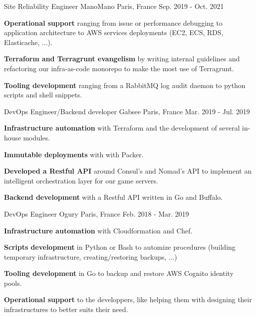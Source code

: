 \begin{cventries}
  \cventry
    {Site Reliability Engineer} %
    {ManoMano} %
    {Paris, France} %
    {Sep. 2019 - Oct. 2021} %
    {
      \begin{cvitems} %
        \item {\textbf{Operational support} ranging from issue or performance debugging to application architecture to AWS services deployments (EC2, ECS, RDS, Elasticache, ...).}
        \item {\textbf{Terraform and Terragrunt evangelism} by writing internal guidelines and refactoring our infra-as-code monorepo to make the most use of Terragrunt.}
        \item {\textbf{Tooling development} ranging from a RabbitMQ log audit daemon to python scripts and shell snippets.}
      \end{cvitems}
    }

  \cventry
    {DevOps Engineer/Backend developer} %
    {Gabsee} %
    {Paris, France} %
    {Mar. 2019 - Jul. 2019} %
    {
      \begin{cvitems} %
        \item {\textbf{Infrastructure automation} with Terraform and the development of several in-house modules.}
        \item {\textbf{Immutable deployments} with with Packer.}
        \item {\textbf{Developed a Restful API} around Consul's and Nomad's API to implement an intelligent orchestration layer for our game servers.}
        \item {\textbf{Backend development} with a Restful API written in Go and Buffalo.}
      \end{cvitems}
    }

  \cventry
    {DevOps Engineer} %
    {Ogury} %
    {Paris, France} %
    {Feb. 2018 - Mar. 2019} %
    {
      \begin{cvitems} %
        \item {\textbf{Infrastructure automation} with Cloudformation and Chef.}
        \item {\textbf{Scripts development} in Python or Bash to automize procedures (building temporary infrastructure, creating/restoring backups, ...)}
        \item {\textbf{Tooling development} in Go to backup and restore AWS Cognito identity pools.}
        \item {\textbf{Operational support} to the developpers, like helping them with designing their infrastructures to better suits their need.}
      \end{cvitems}
    }


\end{cventries}
